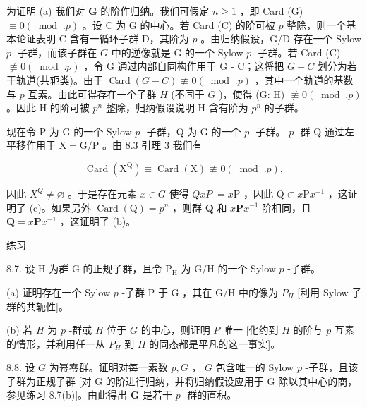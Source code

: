 \documentclass[10pt]{article}
\begin{document}
为证明 (a) 我们对 \(\mathbf{G}\) 的阶作归纳。我们可假定 \(n \geq  1\) ，即 Card (G) \(\equiv  0\left( {{\;\operatorname{mod}\;.}p}\right)\) 。设 \(\mathrm{C}\) 为 \(\mathrm{G}\) 的中心。若 Card (C) 的阶可被 \(p\) 整除，则一个基本论证表明 \(\mathrm{C}\) 含有一循环子群 D，其阶为 \(p\) 。由归纳假设，G/D 存在一个 Sylow \(p\) -子群，而该子群在 \(G\) 中的逆像就是 G 的一个 Sylow \(p\) -子群。若 Card (C) \(\text{ ≢ } 0\left( {{\;\operatorname{mod}\;.}p}\right)\) ，令 G 通过内部自同构作用于 G - C；这将把 \(G - C\) 划分为若干轨道(共轭类)。由于 \(\operatorname{Card}\left( {G - C}\right)  \text{ ≢ } 0\left( {{\;\operatorname{mod}\;.}p}\right)\) ，其中一个轨道的基数与 \(p\) 互素。由此可得存在一个子群 \(H\) (不同于 \(G\) )，使得 (G: H) \(\text{ ≢ } 0\left( {{\;\operatorname{mod}\;.}p}\right)\) 。因此 \(\mathrm{H}\) 的阶可被 \({p}^{n}\) 整除，归纳假设说明 \(\mathrm{H}\) 含有阶为 \({p}^{n}\) 的子群。

现在令 P 为 G 的一个 Sylow \(p\) -子群，Q 为 G 的一个 \(p\) -子群。 \(p\) -群 \(\mathrm{Q}\) 通过左平移作用于 \(\mathrm{X} = \mathrm{G}/\mathrm{P}\) 。由 8.3 引理 3 我们有

\[
\operatorname{Card}\left( {\mathrm{X}}^{\mathrm{Q}}\right)  \equiv  \operatorname{Card}\left( \mathrm{X}\right)  \text{ ≢ } 0\left( {\;\operatorname{mod}\;.p}\right) ,
\]

因此 \({X}^{Q} \neq  \varnothing\) 。于是存在元素 \(x \in  G\) 使得 \({QxP} \; = x\mathrm{P}\) ，因此 \(\mathrm{Q} \subset  x\mathrm{P}{x}^{-1}\) ，这证明了 (c)。如果另外 \(\operatorname{Card}\left( \mathrm{Q}\right)  = {p}^{n}\) ，则群 \(\mathbf{Q}\) 和 \(x\mathbf{P}{x}^{-1}\) 阶相同，且 \(\mathbf{Q} = x\mathbf{P}{x}^{-1}\) ，这证明了 (b)。

练习

8.7. 设 \(\mathrm{H}\) 为群 \(\mathrm{G}\) 的正规子群，且令 \({\mathrm{P}}_{\mathrm{H}}\) 为 \(\mathrm{G}/\mathrm{H}\) 的一个 Sylow \(p\) -子群。

(a) 证明存在一个 Sylow \(p\) -子群 \(\mathrm{P}\) 于 \(\mathrm{G}\) ，其在 \(\mathrm{G}/\mathrm{H}\) 中的像为 \({P}_{H}\) [利用 Sylow 子群的共轭性]。

(b) 若 \(H\) 为 \(p\) -群或 \(H\) 位于 \(G\) 的中心，则证明 \(P\) 唯一 [化约到 \(H\) 的阶与 \(p\) 互素的情形，并利用任一从 \({P}_{H}\) 到 \(H\) 的同态都是平凡的这一事实]。

8.8. 设 \(G\) 为幂零群。证明对每一素数 \(p,G\) ， \(G\) 包含唯一的 Sylow \(p\) -子群，且该子群为正规子群 [对 G 的阶进行归纳，并将归纳假设应用于 G 除以其中心的商，参见练习 8.7(b)]。由此得出 \(\mathbf{G}\) 是若干 \(p\) -群的直积。
\end{document}
